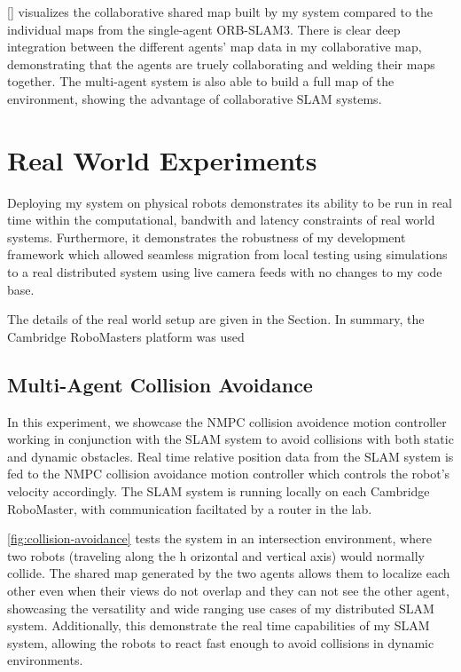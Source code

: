 \autoref{} visualizes the collaborative shared map built by my system compared to the individual maps from the single-agent ORB-SLAM3. There is clear deep integration between the different agents' map data in my collaborative map, demonstrating that the agents are truely collaborating and welding their maps together. The multi-agent system is also able to build a full map of the environment, showing the advantage of collaborative SLAM systems.


\section{Real World Experiments}
\label{sec:real-world-experiments}
Deploying my system on physical robots demonstrates its ability to be run in real time within the computational, bandwith and latency constraints of real world systems. Furthermore, it demonstrates the robustness of my development framework which allowed seamless migration from local testing using simulations to a real distributed system using live camera feeds with no changes to my code base.

The details of the real world setup are given in the  Section. In summary, the Cambridge RoboMasters platform was used

\subsection{Multi-Agent Collision Avoidance}
\label{sec:multi-agent-collision-avoidance}
In this experiment, we showcase the NMPC collision avoidence motion controller working in conjunction with the SLAM system to avoid collisions with both static and dynamic obstacles. Real time relative position data from the SLAM system is fed to the NMPC collision avoidance motion controller which controls the robot's velocity accordingly. The SLAM system is running locally on each Cambridge RoboMaster, with communication faciltated by a router in the lab.

\autoref{fig:collision-avoidance} tests the system in an intersection environment, where two robots (traveling along the h orizontal and vertical axis) would normally collide. The shared map generated by the two agents allows them to localize each other even when their views do not overlap and they can not see the other agent, showcasing the versatility and wide ranging use cases of my distributed SLAM system. Additionally, this demonstrate the real time capabilities of my SLAM system, allowing the robots to react fast enough to avoid collisions in dynamic environments.

